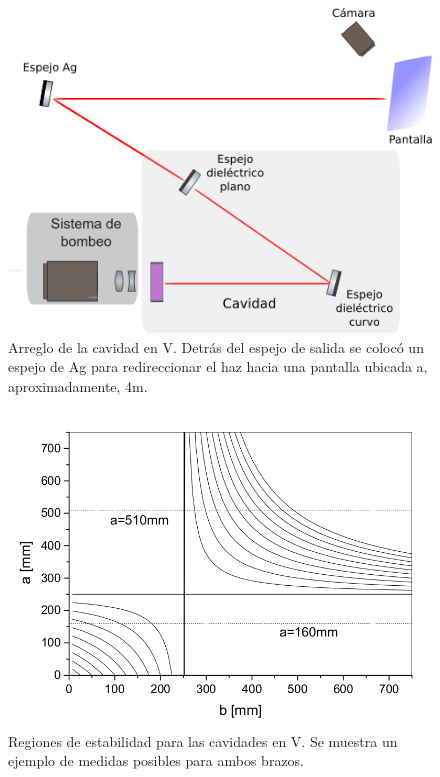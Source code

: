 \documentclass[10pt, a4paper]{article}%
\begin{document}
\begin{multicols}{2}
\begin{figure}[H]
    \centering
    \includegraphics[scale=0.5]{Graficos/cavV1.png}
    \caption{Arreglo de la cavidad en V. Detrás del espejo de salida se colocó un espejo de Ag para redireccionar el haz hacia una pantalla ubicada a, aproximadamente, 4m.}
    \label{cavV1}
\end{figure}

\begin{figure}[H]
    \centering
    \includegraphics[scale=0.27]{Graficos/estabilidad.png}
    \caption{Regiones de estabilidad para las cavidades en V. Se muestra un ejemplo de medidas posibles para ambos brazos.}
    \label{estabilidad}
\end{figure}



\end{multicols}
\end{document}
